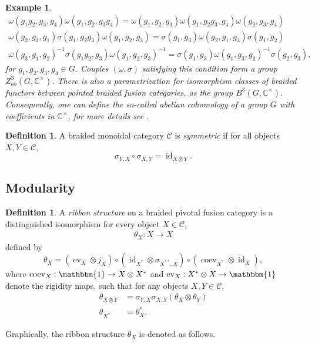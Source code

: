 \documentclass[11pt]{book}
\theoremstyle{Rem}
\newtheorem{Expl}[theorem]{Example}
\theoremstyle{definition}
\newtheorem{Def}[theorem]{Definition}
\numberwithin{equation}{section}
\newcommand\inv{^{-1}}
\newcommand\id{\operatorname{id}}
\newcommand\kk{\mathbb C}
\newcommand\C{\mathcal C}
\newcommand\ev{\operatorname{ev}}
\newcommand\coev{\operatorname{coev}}
\begin{document}
\begin{Expl}
\begin{align*}
 	\omega(g_1g_2, g_3, g_4) \omega(g_1, g_2, g_3g_4) = \omega(g_1, g_2, g_3) \omega(g_1, g_2g_3, g_4) \omega(g_2, g_3, g_4)\\
 	\omega (g_2, g_3, g_1) \sigma(g_1, g_2g_3) \omega(g_1, g_2, g_3) = \sigma(g_1, g_3) \omega(g_2, g_1, g_3) \sigma(g_1, g_2)\\
 	\omega(g_3, g_1, g_2)\inv \sigma(g_1g_2, g_3) \omega(g_1, g_2, g_3) \inv = \sigma(g_1, g_3) \omega(g_1, g_3, g_2)\inv \sigma(g_2, g_3),
 \end{align*}for $g_1, g_2, g_3, g_4 \in G$. Couples $(\omega, \sigma)$ satisfying this condition form a group $Z_{ab}^3(G, \kk^\times)$. There is also a parametrization for isomorphism classes of braided functors between pointed braided fusion categories, as the group $B^3(G, \kk^\times)$. Consequently, one can define the so-called \textit{abelian cohomology} of a group $G$ with coefficients in $\kk^\times$, for more details see \cite[Section 8.4]{EGNO}.
\end{Expl}
\begin{Def}
A braided monoidal category $\C$ is \textit{symmetric} if for all objects $X, Y \in \C$, \begin{equation}
	\sigma_{Y, X} \circ \sigma_{X, Y} = \id_{X\otimes Y}. 
\end{equation}

\end{Def}
\subsection{Modularity}
\begin{Def}\rm\label{twistdef}
 A \textit{ribbon structure} on a braided pivotal fusion category is a distinguished isomorphism for every object $X\in \C$,
\begin{align}
\theta_X: X \rightarrow X\nonumber
\end{align}
defined by \begin{equation}
 	 \theta_X = (\ev_X \otimes j_X)\circ(\id_{X^*} \otimes \sigma_{X^{**}, X})\circ(\coev_{X^*} \otimes \id_X),\label{thetax} 
 \end{equation}
 where $\coev_X:\mathbbm{1}\rightarrow X\otimes X^*$ and $\ev_X:X^*\otimes X\rightarrow \mathbbm{1}$ denote the rigidity maps, such that for any objects $X,Y \in \C$, \begin{align}
\theta_{X\otimes Y} &= \sigma_{Y,X}\sigma_{X,Y}(\theta_X\otimes \theta_Y)\label{twist}\\
\theta_{X^*}&=\theta_X^*. \label{twistdual}
\end{align}
 \end{Def}
Graphically, the ribbon structure $\theta_X$ is denoted as follows.
\end{document}

